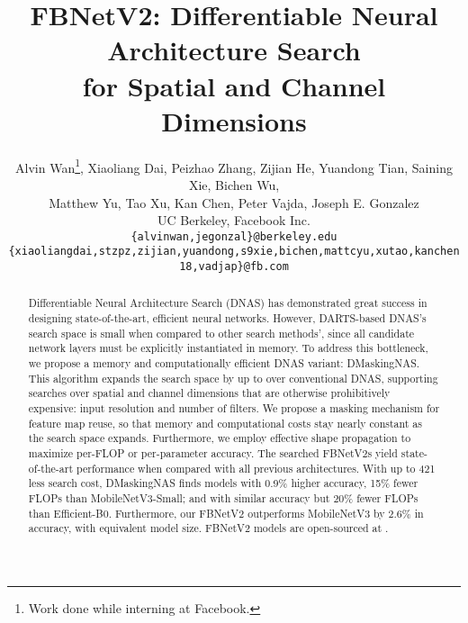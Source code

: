 \documentclass[10pt,twocolumn,letterpaper]{article}
\begin{document}
\title{FBNetV2: Differentiable Neural Architecture Search \\for Spatial and Channel Dimensions} 
\author{
Alvin Wan\thanks{Work done while interning at Facebook.}, Xiaoliang Dai, Peizhao Zhang, Zijian He, Yuandong Tian, Saining Xie, Bichen Wu, \\
Matthew Yu, Tao Xu, Kan Chen, Peter Vajda, Joseph E. Gonzalez\\
UC Berkeley, Facebook Inc.\\
{\tt\small \{alvinwan,jegonzal\}@berkeley.edu}\\
{\tt\small \{xiaoliangdai,stzpz,zijian,yuandong,s9xie,bichen,mattcyu,xutao,kanchen18,vadjap\}@fb.com}
}

\maketitle




\begin{abstract}
Differentiable Neural Architecture Search (DNAS) has demonstrated great success in designing state-of-the-art, efficient neural networks. However, DARTS-based DNAS's search space is small when compared to other search methods', since all candidate network layers must be explicitly instantiated in memory. To address this bottleneck, we propose a memory and computationally efficient DNAS variant: DMaskingNAS.  This algorithm expands the search space by up to  over conventional DNAS, supporting searches over spatial and channel dimensions that are otherwise prohibitively expensive: input resolution and number of filters. We propose a masking mechanism for feature map reuse, so that memory and computational costs stay nearly constant as the search space expands. Furthermore, we employ  effective shape propagation to maximize per-FLOP or per-parameter accuracy. The searched FBNetV2s yield state-of-the-art performance when compared with all previous architectures.
With up to 421 less search cost, DMaskingNAS finds models with 0.9\% higher accuracy, 15\% fewer FLOPs than MobileNetV3-Small; and with similar accuracy but 20\% fewer FLOPs than Efficient-B0. Furthermore, our FBNetV2 outperforms MobileNetV3 by 2.6\% in accuracy, with equivalent model size. FBNetV2 models are open-sourced at \hyperlink{https://github.com/facebookresearch/mobile-vision}{\color{blue}{https://github.com/facebookresearch/mobile-vision}}.



\vspace{-0.2in}



\end{abstract}
\end{document}
